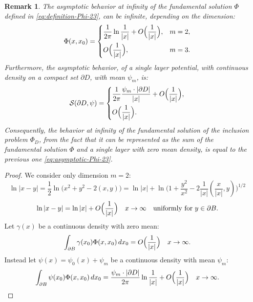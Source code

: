 \documentclass[10pt, a4paper, twoside, openright]{book}
\theoremstyle{definition}
\theoremstyle{plain}
\theoremstyle{plain}
\theoremstyle{plain}
\theoremstyle{plain}
\newtheorem{remark}[subsection]{Remark}
\theoremstyle{plain}
\theoremstyle{plain}
\theoremstyle{plain}
\theoremstyle{plain}
\begin{document}
\begin{remark}
 The asymptotic behavior at infinity of the fundamental solution $\Phi$ defined in \eqref{eq:definition-Phi-23}, can be infinite, depending on the dimension:
 \begin{equation}
 \label{eq:asymptotic-Phi-23}
  \Phi(x,x_0)=
  \left\{
  \begin{aligned}
   &\dfrac{1}{2\pi}\ln\dfrac{1}{|x|} + O\Bigl(\dfrac{1}{|x|}\Bigr), && m=2, \\
   &O\Bigl(\dfrac{1}{|x|}\Bigr), && m=3.
  \end{aligned}
  \right.
\end{equation}
 Furthermore, the asymptotic behavior, of a single layer potential, with continuous density on a compact set $\partial D$, with mean $\psi_m$, is:
  \begin{equation}
 \label{eq:asymptotic-single}
  \mathcal{S}(\partial D,\psi)=
  \left\{
  \begin{aligned}
   &\dfrac{1}{2\pi}\dfrac{\psi_m\cdot|\partial D|}{|x|} + O\Bigl(\dfrac{1}{|x|}\Bigr), \\%
   &O\Bigl(\dfrac{1}{|x|}\Bigr). %
  \end{aligned}
  \right.
\end{equation}
Consequently, the behavior at infinity of the fundamental solution of the inclusion problem $\Phi_D$, 
from the fact that it can be represented as the sum of the fundamental solution $\Phi$ and a single layer with zero mean density, is equal to the previous one \eqref{eq:asymptotic-Phi-23}. 
\end{remark}
\begin{proof} We consider only dimension $m=2$:
 \begin{equation}
  \ln|x-y|=\frac{1}{2}\ln\Big(x^2 + y^2 - 2 (x,y)\Big) = \ln|x| + \ln\Big(1+\frac{y^2}{x^2}-2\frac{1}{|x|}(\frac{x}{|x|},y)\Big)^{1/2}
 \end{equation}
 \begin{equation}
  \ln|x-y|=\ln|x|+O\Bigl(\frac{1}{|x|}\Bigr) \quad x\to\infty\quad \text{uniformly for }y\in\partial B.
 \end{equation}
 Let $\gamma(x)$ be a continuous density with zero mean:
 \begin{equation}
  \int_{\partial B}\gamma(x_0)\Phi(x,x_0)\, dx_0 = O\Bigl(\frac{1}{|x|}\Bigr)\quad x\to\infty.
 \end{equation}
 Instead let $\psi(x)=\psi_0(x)+\psi_m$ be a continuous density with mean $\psi_m$:
 \begin{equation}
  \int_{\partial B}\psi(x_0)\Phi(x,x_0)\, dx_0 = \dfrac{\psi_m\cdot |\partial D|}{2\pi}\ln\dfrac{1}{|x|} + O\Bigl(\frac{1}{|x|}\Bigr)\quad x\to\infty.
 \end{equation}
\end{proof}
\end{document}
